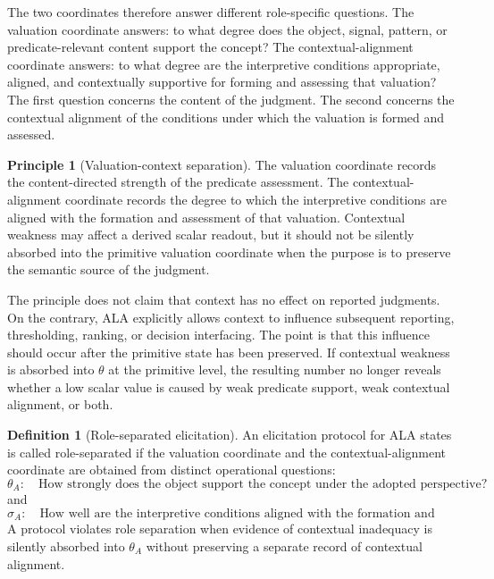 \documentclass[reqno,final]{amsart}
\theoremstyle{definition}
\newtheorem{definition}{Definition}
\newtheorem{principle}{Principle}
\theoremstyle{plain}
\theoremstyle{remark}
\begin{document}
The two coordinates therefore answer different role-specific questions. The valuation coordinate answers: to what degree does the object, signal, pattern, or predicate-relevant content support the concept? The contextual-alignment coordinate answers: to what degree are the interpretive conditions appropriate, aligned, and contextually supportive for forming and assessing that valuation? The first question concerns the content of the judgment. The second concerns the contextual alignment of the conditions under which the valuation is formed and assessed.

\begin{principle}[Valuation-context separation]
The valuation coordinate records the content-directed strength of the predicate assessment. The contextual-alignment coordinate records the degree to which the interpretive conditions are aligned with the formation and assessment of that valuation. Contextual weakness may affect a derived scalar readout, but it should not be silently absorbed into the primitive valuation coordinate when the purpose is to preserve the semantic source of the judgment.
\end{principle}

The principle does not claim that context has no effect on reported judgments. On the contrary, ALA explicitly allows context to influence subsequent reporting, thresholding, ranking, or decision interfacing. The point is that this influence should occur after the primitive state has been preserved. If contextual weakness is absorbed into \(\theta\) at the primitive level, the resulting number no longer reveals whether a low scalar value is caused by weak predicate support, weak contextual alignment, or both.

\begin{definition}[Role-separated elicitation]
An elicitation protocol for ALA states is called role-separated if the valuation coordinate and the contextual-alignment coordinate are obtained from distinct operational questions:
\[
\theta_A:\quad \text{How strongly does the object support the concept under the adopted perspective?}
\]
and
\[
\sigma_A:\quad \text{How well are the interpretive conditions aligned with the formation and assessment of that valuation?}
\]
A protocol violates role separation when evidence of contextual inadequacy is silently absorbed into \(\theta_A\) without preserving a separate record of contextual alignment.
\end{definition}
\end{document}
